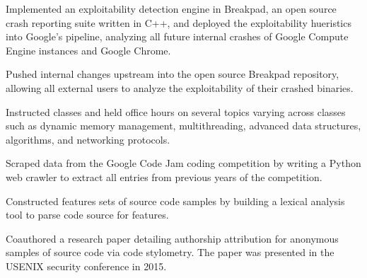 \documentclass[]{template}
\begin{document}
\begin{tightemize}
\item Implemented an exploitability detection engine in Breakpad, an open source crash reporting suite written in C++, and deployed the exploitability hueristics into Google's pipeline, analyzing all future internal crashes of Google Compute Engine instances and Google Chrome.
\item Pushed internal changes upstream into the open source Breakpad repository, allowing all external users to analyze the exploitability of their crashed binaries.
\end{tightemize}
\sectionsep

\begin{tightemize}
\item Instructed classes and held office hours on several topics varying across classes such as dynamic memory management, multithreading, advanced data structures, algorithms, and networking protocols.
\end{tightemize}
\sectionsep

\begin{tightemize}
\item Scraped data from the Google Code Jam coding competition by writing a Python web crawler to extract all entries from previous years of the competition.
\item Constructed features sets of source code samples by building a lexical analysis tool to parse code source for features.
\item Coauthored a research paper detailing authorship attribution for anonymous samples of source code via code stylometry. The paper was presented in the USENIX security conference in 2015.
\end{tightemize}
\sectionsep
\end{document}
